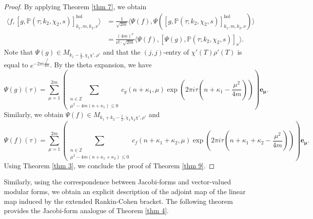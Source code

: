 \documentclass[11pt]{amsart}
\theoremstyle{definition}
\theoremstyle{remark}
\numberwithin{equation}{section}
\renewcommand{\(}{\left(}
\renewcommand{\)}{\right)}
\def\ZZ{\mathbb{Z}}
\begin{document}
\begin{proof}
    By applying Theorem \ref{thm 7}, we obtain
    \begin{equation*}
        \begin{aligned}
            \langle f, [g,\mathbb{P}(\tau;k_2,\chi_2,s)]_{k_1,m,k_2,\nu}^{\mathrm{hol}} \rangle&=\frac{1}{\sqrt{2m}}\langle \Psi(f), \Psi([g,\mathbb{P}(\tau;k_2,\chi_2,s)]^{\mathrm{hol}}_{k_1,m,k_2,\nu}) \rangle\\
            &=\frac{(4m)^{\nu}}{\nu ! \cdot \sqrt{2m}}\langle \Psi(f), [\Psi(g),\mathbb{P}(\tau;k_2,\chi_2,s)]_{\nu} \rangle.
        \end{aligned}
    \end{equation*}
    Note that $\Psi(g)\in M_{k_1-\frac{1}{2},\chi_1\chi',\rho'}$ and that the $(j,j)$-entry of $\chi'(T)\rho'(T)$ is equal to $e^{-2\pi i \frac{j^2}{4m}}$.
    By the theta expansion, we have 
    \begin{equation*}
        \Psi(g)(\tau)=\sum_{\mu=1}^{2m} \left(\sum_{\substack{n\in \ZZ\\ \mu^2-4m(n+\kappa_1)\leq 0}} c_g(n+\kappa_1,\mu) \exp\left(2\pi i\tau \left(n+\kappa_1-\frac{\mu^2}{4m} \right)\right)\right) \mathbf{e_{\mu}}.
    \end{equation*}
    Similarly, we obtain $\Psi(f)\in M_{k_1+k_2-\frac{1}{2},\chi_1\chi_2\chi',\rho'}$ and 
    \begin{equation*}
        \Psi(f)(\tau)=\sum_{\mu=1}^{2m} \left(\sum_{\substack{n\in \ZZ\\ \mu^2-4m(n+\kappa_1+\kappa_2)\leq 0}} c_f(n+\kappa_1+\kappa_2,\mu) \exp\left(2\pi i\tau \left(n+\kappa_1+\kappa_2-\frac{\mu^2}{4m} \right)\right)\right) \mathbf{e_{\mu}}.
    \end{equation*}
    Using Theorem \ref{thm 3}, we conclude the proof of  Theorem \ref{thm 9}.
\end{proof}

Similarly, using the correspondence between Jacobi-forms and vector-valued modular forms, we obtain an explicit description of the adjoint map of the linear map induced by the extended Rankin-Cohen bracket.
The following theorem provides the Jacobi-form analogue of Theorem \ref{thm 4}.
\end{document}
